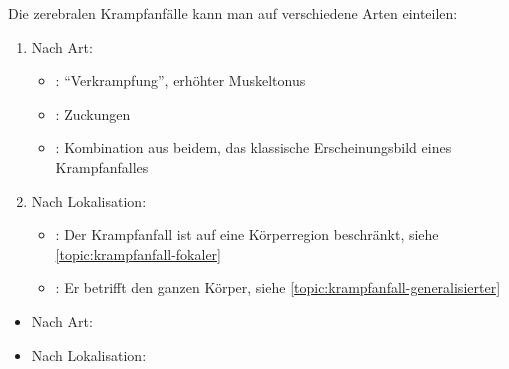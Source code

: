 {%
Die zerebralen Krampfanfälle kann man auf verschiedene Arten
einteilen:
\begin{enumerate}
  \item Nach Art:
  \begin{itemize}
    \item {}: \enquote{Verkrampfung}, erhöhter
    Muskeltonus
    \item {}: Zuckungen
    \item {}: Kombination aus beidem, das
    klassische Erscheinungsbild eines Krampfanfalles
  \end{itemize}
  \item Nach Lokalisation:
  \begin{itemize}
    \item {}: Der Krampfanfall ist auf
    eine Körperregion beschränkt, siehe
    \ref{topic:krampfanfall-fokaler}
    \item {}: Er betrifft den
    ganzen Körper, siehe
    \ref{topic:krampfanfall-generalisierter}
    
  \end{itemize}
\end{enumerate}
}{%
\begin{itemize}
  \item Nach Art:
  \item Nach Lokalisation:
\end{itemize}
}{}{}{}


